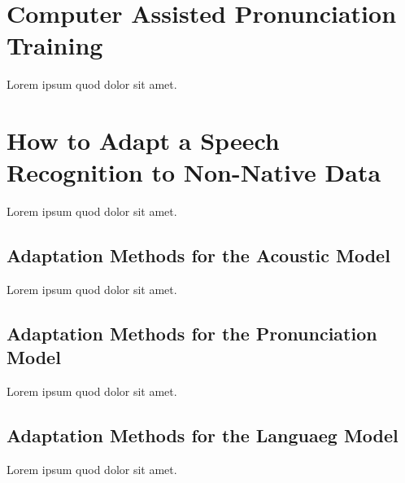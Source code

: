 \chapter{Computer Assisted Pronunciation Training}\label{ch:capt}

Lorem ipsum quod dolor sit amet.

\chapter{How to Adapt a Speech Recognition to Non-Native Data}\label{ch:how-to-adapt}
Lorem ipsum quod dolor sit amet.

\section{Adaptation Methods for the Acoustic Model}
Lorem ipsum quod dolor sit amet.

\section{Adaptation Methods for the Pronunciation Model}
Lorem ipsum quod dolor sit amet.

\section{Adaptation Methods for the Languaeg Model}
Lorem ipsum quod dolor sit amet.


